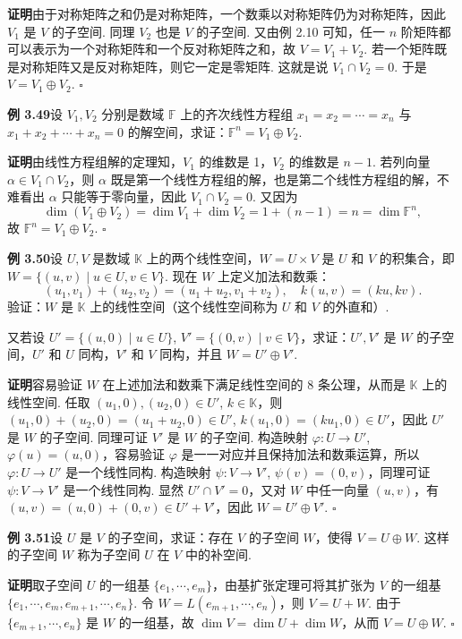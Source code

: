 \documentclass[UTF8, 12pt, fontset=fandol, oneside]{ctexart}
\begin{document}
\noindent\textbf{证明}\quad 由于对称矩阵之和仍是对称矩阵，一个数乘以对称矩阵仍为对称矩阵，因此 $V_1$ 是 $V$ 的子空间. 同理 $V_2$ 也是 $V$ 的子空间. 又由例 2.10 可知，任一 $n$ 阶矩阵都可以表示为一个对称矩阵和一个反对称矩阵之和，故 $V=V_1+V_2$. 若一个矩阵既是对称矩阵又是反对称矩阵，则它一定是零矩阵. 这就是说 $V_1\cap V_2=0$. 于是 $V=V_1\oplus V_2$. $\square$

\noindent\textbf{例 3.49}\quad 设 $V_1,V_2$ 分别是数域 $\mathbb{F}$ 上的齐次线性方程组 $x_1=x_2=\cdots=x_n$ 与 $x_1+x_2+\cdots+x_n=0$ 的解空间，求证：$\mathbb{F}^n=V_1\oplus V_2$.

\noindent\textbf{证明}\quad 由线性方程组解的定理知，$V_1$ 的维数是 1，$V_2$ 的维数是 $n-1$. 若列向量 $\alpha\in V_1\cap V_2$，则 $\alpha$ 既是第一个线性方程组的解，也是第二个线性方程组的解，不难看出 $\alpha$ 只能等于零向量，因此 $V_1\cap V_2=0$. 又因为
\[
\dim(V_1\oplus V_2)=\dim V_1+\dim V_2=1+(n-1)=n=\dim\mathbb{F}^n,
\]
故 $\mathbb{F}^n=V_1\oplus V_2$. $\square$

\noindent\textbf{例 3.50}\quad 设 $U,V$ 是数域 $\mathbb{K}$ 上的两个线性空间，$W=U\times V$ 是 $U$ 和 $V$ 的积集合，即 $W=\{(u,v)\mid u\in U,v\in V\}$. 现在 $W$ 上定义加法和数乘：
\[
(u_1,v_1)+(u_2,v_2)=(u_1+u_2,v_1+v_2),\quad k(u,v)=(ku,kv).
\]
验证：$W$ 是 $\mathbb{K}$ 上的线性空间（这个线性空间称为 $U$ 和 $V$ 的外直和）.

又若设 $U'=\{(u,0)\mid u\in U\}$, $V'=\{(0,v)\mid v\in V\}$，求证：$U',V'$ 是 $W$ 的子空间，$U'$ 和 $U$ 同构，$V'$ 和 $V$ 同构，并且 $W=U'\oplus V'$.

\noindent\textbf{证明}\quad 容易验证 $W$ 在上述加法和数乘下满足线性空间的 8 条公理，从而是 $\mathbb{K}$ 上的线性空间. 任取 $(u_1,0),(u_2,0)\in U'$, $k\in\mathbb{K}$，则 $(u_1,0)+(u_2,0)=(u_1+u_2,0)\in U'$, $k(u_1,0)=(ku_1,0)\in U'$，因此 $U'$ 是 $W$ 的子空间. 同理可证 $V'$ 是 $W$ 的子空间. 构造映射 $\varphi:U\to U'$, $\varphi(u)=(u,0)$，容易验证 $\varphi$ 是一一对应并且保持加法和数乘运算，所以 $\varphi:U\to U'$ 是一个线性同构. 构造映射 $\psi:V\to V'$, $\psi(v)=(0,v)$，同理可证 $\psi:V\to V'$ 是一个线性同构. 显然 $U'\cap V'=0$，又对 $W$ 中任一向量 $(u,v)$，有 $(u,v)=(u,0)+(0,v)\in U'+V'$，因此 $W=U'\oplus V'$. $\square$

\noindent\textbf{例 3.51}\quad 设 $U$ 是 $V$ 的子空间，求证：存在 $V$ 的子空间 $W$，使得 $V=U\oplus W$. 这样的子空间 $W$ 称为子空间 $U$ 在 $V$ 中的补空间.

\noindent\textbf{证明}\quad 取子空间 $U$ 的一组基 $\{e_1,\cdots,e_m\}$，由基扩张定理可将其扩张为 $V$ 的一组基 $\{e_1,\cdots,e_m,e_{m+1},\cdots,e_n\}$. 令 $W=L(e_{m+1},\cdots,e_n)$，则 $V=U+W$. 由于 $\{e_{m+1},\cdots,e_n\}$ 是 $W$ 的一组基，故 $\dim V=\dim U+\dim W$，从而 $V=U\oplus W$. $\square$
\end{document}
